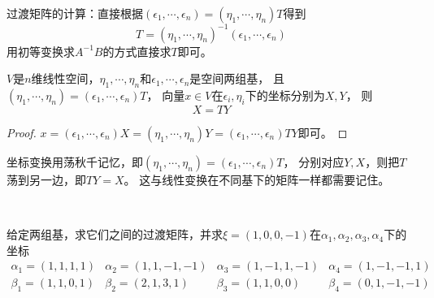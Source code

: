 \begin{note}
  过渡矩阵的计算：直接根据$(\epsilon_1,\cdots,\epsilon_n) = (\eta_1,\cdots,\eta_n)T$得到
  \begin{equation*}
    T = (\eta_1,\cdots,\eta_n)^{-1}(\epsilon_1,\cdots,\epsilon_n)
  \end{equation*}
  用初等变换求$A^{-1}B$的方式直接求$T$即可。
\end{note}


\begin{theorem}[坐标变换]
  $V$是$n$维线性空间，$\eta_1,\cdots,\eta_n$和$\epsilon_1,\cdots,\epsilon_n$是空间两组基，
  且$(\eta_1,\cdots,\eta_n) = (\epsilon_1,\cdots,\epsilon_n)T$，
  向量$x \in V$在$\epsilon_i,\eta_i$下的坐标分别为$X,Y$，
  则
  \begin{equation*}
    X = TY
  \end{equation*}
\end{theorem}

\begin{proof}
  $x = (\epsilon_1,\cdots,\epsilon_n)X = (\eta_1,\cdots, \eta_n)Y = (\epsilon_1,\cdots,\epsilon_n)TY$即可。
\end{proof}

\begin{note}
  坐标变换用荡秋千记忆，即$(\eta_1,\cdots,\eta_n) = (\epsilon_1,\cdots,\epsilon_n)T$，
  分别对应$Y,X$，则把$T$荡到另一边，即$TY = X$。
  这与线性变换在不同基下的矩阵一样都需要记住。
\end{note}

~

\begin{exercise}[过渡矩阵的计算]
  给定两组基，求它们之间的过渡矩阵，并求$\xi = (1,0,0,-1)$在$\alpha_1,\alpha_2,\alpha_3,\alpha_4$下的坐标
  \begin{equation*}
    \begin{array}{cccc}
      \alpha_1 = (1,1,1,1)&\alpha_2 = (1,1,-1,-1)&\alpha_3 = (1,-1,1,-1)&\alpha_4 = (1,-1,-1,1) \\
                          \beta_1 = (1,1,0,1)&\beta_2 = (2,1,3,1)&\beta_3 = (1,1,0,0)&\beta_4 = (0,1,-1,-1)
    \end{array}
  \end{equation*}
\end{exercise}

